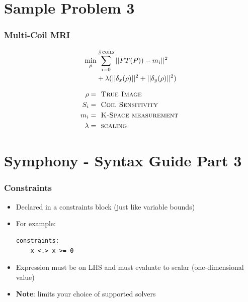 \documentclass[presentation]{beamer}
\begin{document}
\section{Sample Problem 3}
\begin{frame}
  \frametitle{Multi-Coil MRI}

  \begin{align*}
    \min \limits_{\rho} &\sum \limits_{i=0}^{\textsc{\#coils}} || FT(P))-m_i||^2 \\
                             &+ \lambda (||\delta_x (\rho) ||^2 + || \delta_y(\rho) ||^2) \\
  \end{align*}
  
  \begin{align*}
    \rho &= \textsc{ True Image} \\
    S_i &= \textsc{ Coil Sensitivity} \\
    m_i &= \textsc{ K-Space measurement } \\
    \lambda &= \textsc{ scaling }
  \end{align*}

\end{frame}
\section{Symphony - Syntax Guide Part 3}

\begin{frame}[fragile]
  \frametitle{Constraints}

  \begin{itemize}
  \item Declared in a {\color{red} constraints} block (just like variable bounds)
  \item For example:
  \begin{lstlisting}[style=Haskell]
  constraints:
    x <.> x >= 0  
  \end{lstlisting}
  \item Expression must be on LHS and must evaluate to scalar (one-dimensional value)
  \item {\bf Note}: limits your choice of supported solvers 
  \end{itemize}
\end{frame}
\end{document}
